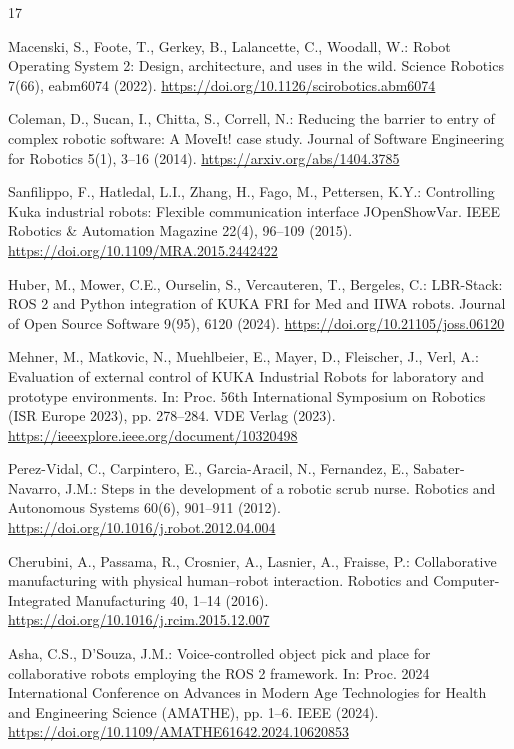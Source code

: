 \documentclass{svproc}
\begin{document}
\begin{thebibliography}{17}

Macenski, S., Foote, T., Gerkey, B., Lalancette, C., Woodall, W.: Robot Operating System 2: Design, architecture, and uses in the wild. Science Robotics 7(66), eabm6074 (2022). \url{https://doi.org/10.1126/scirobotics.abm6074}

Coleman, D., Sucan, I., Chitta, S., Correll, N.: Reducing the barrier to entry of complex robotic software: A MoveIt! case study. Journal of Software Engineering for Robotics 5(1), 3--16 (2014). \url{https://arxiv.org/abs/1404.3785}

Sanfilippo, F., Hatledal, L.I., Zhang, H., Fago, M., Pettersen, K.Y.: Controlling Kuka industrial robots: Flexible communication interface JOpenShowVar. IEEE Robotics \& Automation Magazine 22(4), 96--109 (2015). \url{https://doi.org/10.1109/MRA.2015.2442422}

Huber, M., Mower, C.E., Ourselin, S., Vercauteren, T., Bergeles, C.: LBR-Stack: ROS 2 and Python integration of KUKA FRI for Med and IIWA robots. Journal of Open Source Software 9(95), 6120 (2024). \url{https://doi.org/10.21105/joss.06120}

Mehner, M., Matkovic, N., Muehlbeier, E., Mayer, D., Fleischer, J., Verl, A.: Evaluation of external control of KUKA Industrial Robots for laboratory and prototype environments. In: Proc. 56th International Symposium on Robotics (ISR Europe 2023), pp. 278--284. VDE Verlag (2023). \url{https://ieeexplore.ieee.org/document/10320498}

Perez-Vidal, C., Carpintero, E., Garcia-Aracil, N., Fernandez, E., Sabater-Navarro, J.M.: Steps in the development of a robotic scrub nurse. Robotics and Autonomous Systems 60(6), 901--911 (2012). \url{https://doi.org/10.1016/j.robot.2012.04.004}

Cherubini, A., Passama, R., Crosnier, A., Lasnier, A., Fraisse, P.: Collaborative manufacturing with physical human--robot interaction. Robotics and Computer-Integrated Manufacturing 40, 1--14 (2016). \url{https://doi.org/10.1016/j.rcim.2015.12.007}

Asha, C.S., D'Souza, J.M.: Voice-controlled object pick and place for collaborative robots employing the ROS 2 framework. In: Proc. 2024 International Conference on Advances in Modern Age Technologies for Health and Engineering Science (AMATHE), pp. 1--6. IEEE (2024). \url{https://doi.org/10.1109/AMATHE61642.2024.10620853}


\end{thebibliography}
\end{document}
